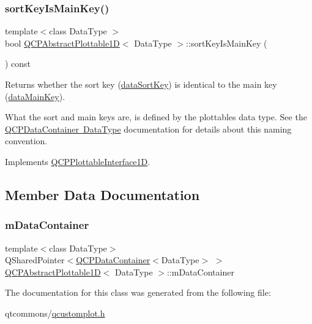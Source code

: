 \subsubsection{\texorpdfstring{sortKeyIsMainKey()}{sortKeyIsMainKey()}}
{\footnotesize\ttfamily template$<$class Data\+Type $>$ \\
bool \mbox{\hyperlink{class_q_c_p_abstract_plottable1_d}{Q\+C\+P\+Abstract\+Plottable1D}}$<$ Data\+Type $>$\+::sort\+Key\+Is\+Main\+Key (\begin{DoxyParamCaption}{ }\end{DoxyParamCaption}) const\hspace{0.3cm}{\ttfamily [virtual]}}





Returns whether the sort key (\mbox{\hyperlink{class_q_c_p_abstract_plottable1_d_aa8277da921b009bce474437d50b4a2d8}{data\+Sort\+Key}}) is identical to the main key (\mbox{\hyperlink{class_q_c_p_abstract_plottable1_d_aeb156ebf5d3c8de906b428be30733ad8}{data\+Main\+Key}}).

What the sort and main keys are, is defined by the plottable\textquotesingle{}s data type. See the \mbox{\hyperlink{class_q_c_p_data_container_qcpdatacontainer-datatype}{Q\+C\+P\+Data\+Container Data\+Type}} documentation for details about this naming convention. 

Implements \mbox{\hyperlink{class_q_c_p_plottable_interface1_d_a229e65e7ab968dd6cd0e259fa504b79d}{Q\+C\+P\+Plottable\+Interface1D}}.



\subsection{Member Data Documentation}
\mbox{\label{class_q_c_p_abstract_plottable1_d_ac139cf70590707a1fb40eabe97fac246}} 
\subsubsection{\texorpdfstring{mDataContainer}{mDataContainer}}
{\footnotesize\ttfamily template$<$class Data\+Type$>$ \\
Q\+Shared\+Pointer$<$\mbox{\hyperlink{class_q_c_p_data_container}{Q\+C\+P\+Data\+Container}}$<$Data\+Type$>$ $>$ \mbox{\hyperlink{class_q_c_p_abstract_plottable1_d}{Q\+C\+P\+Abstract\+Plottable1D}}$<$ Data\+Type $>$\+::m\+Data\+Container\hspace{0.3cm}{\ttfamily [protected]}}



The documentation for this class was generated from the following file\+:\begin{DoxyCompactItemize}
\item 
qtcommons/\mbox{\hyperlink{qcustomplot_8h}{qcustomplot.\+h}}\end{DoxyCompactItemize}
